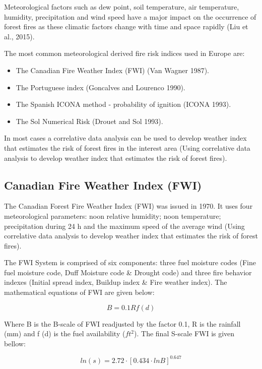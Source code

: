 {{	Meteorological factors such as dew point, soil temperature, air temperature, humidity, precipitation and wind speed have
	a major impact on the occurrence of forest fires as these climatic factors change with time and space rapidly (Liu et al., 2015).
	
	The most common meteorological derived fire risk indices used in Europe are:
	
	\begin{itemize}
		\item The Canadian Fire Weather Index (FWI) (Van Wagner 1987).
		\item The Portuguese index (Goncalves and Lourenco 1990).
		\item The Spanish ICONA method - probability of ignition (ICONA 1993).
		\item The Sol Numerical Risk (Drouet and Sol 1993).
	\end{itemize}

	In most cases a correlative data analysis can be used to develop weather index that estimates the risk of forest fires in the interest area (Using correlative data analysis to develop weather index that estimates the risk of forest fires).

\subsection{Canadian Fire Weather Index (FWI)}
	The Canadian Forest Fire Weather Index (FWI) was issued in 1970. It uses four meteorological parameters: noon relative humidity; noon temperature; precipitation during 24 h and the maximum speed of the average wind (Using correlative data analysis to develop weather index that estimates the risk of forest fires).
	
	The FWI System is comprised of six components: three fuel moisture codes (Fine fuel moisture code, Duff Moisture code \& Drought code) and three fire behavior indexes (Initial spread index, Buildup index \& Fire weather index). The mathematical equations of FWI are given below:
	
	\begin{equation}
	B=0.1Rf(d)
	\end{equation}
	
	Where B is the B-scale of FWI readjusted by the factor 0.1, R is the rainfall (mm) and f (d) is the fuel availability ($ft^2$). The final
	S-scale FWI is given bellow:

	\begin{equation}
	ln(s)=2.72 \cdot [0.434 \cdot lnB]^{0.647}
	\end{equation}
	
}}

